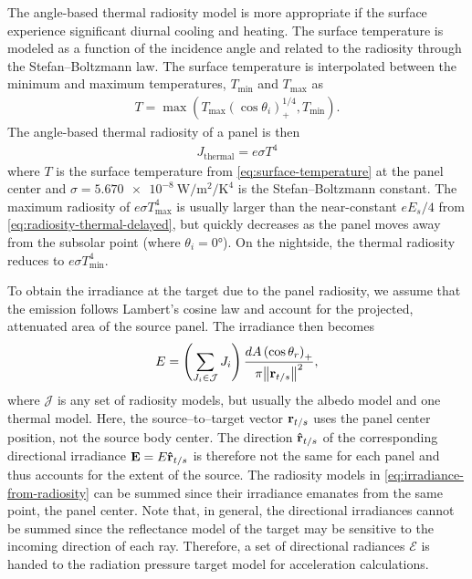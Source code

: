 The angle-based thermal radiosity model is more appropriate if the surface experience significant diurnal cooling and heating. The surface temperature is modeled as a function of the incidence angle and related to the radiosity through the Stefan--Boltzmann law. The surface temperature is interpolated between the minimum and maximum temperatures, $T_\text{min}$ and $T_\text{max}$ as
\begin{align}
    \label{eq:surface-temperature}
    T = \max\left( T_\text{max} \left(\cos\theta_i\right)_+^{1/4}, T_\text{min} \right).
\end{align}
The angle-based thermal radiosity of a panel is then~\cite{Lemoine2013}
\begin{align}
    \label{eq:radiosity-thermal-anglebased}
    J_\text{thermal} = e \sigma T^4
\end{align}
where $T$ is the surface temperature from \cref{eq:surface-temperature} at the panel center and $\sigma = \qty{5.670e-8}{\W\per\m\squared\per\K\tothe{4}}$ is the Stefan--Boltzmann constant. The maximum radiosity of $e \sigma T_\text{max}^4$ is usually larger than the near-constant $e E_s/4$ from \cref{eq:radiosity-thermal-delayed}, but quickly decreases as the panel moves away from the subsolar point (where $\theta_i = \ang{0}$). On the nightside, the thermal radiosity reduces to $e \sigma T_\text{min}^4$.

To obtain the irradiance at the target due to the panel radiosity, we assume that the emission follows Lambert's cosine law and account for the projected, attenuated area of the source panel. The irradiance then becomes
\begin{align}
    \label{eq:irradiance-from-radiosity}
    E = \left(\sum_{J_i \in \mathcal{J}} J_i\right) \frac{dA \left(\cos\theta_r\right)_+}{\pi\norm{\vb r_{t/s}}^2},
\end{align}
where $\mathcal{J}$ is any set of radiosity models, but usually the albedo model and one thermal model. Here, the source--to--target vector $\vb r_{t/s}$ uses the panel center position, not the source body center. The direction $\vu r_{t/s}$ of the corresponding directional irradiance $\vb E = E \vu r_{t/s}$  is therefore not the same for each panel and thus accounts for the extent of the source. The radiosity models in \cref{eq:irradiance-from-radiosity} can be summed since their irradiance emanates from the same point, the panel center. Note that, in general, the directional irradiances cannot be summed since the reflectance model of the target may be sensitive to the incoming direction of each ray. Therefore, a set of directional radiances $\mathcal{E}$ is handed to the radiation pressure target model for acceleration calculations.




